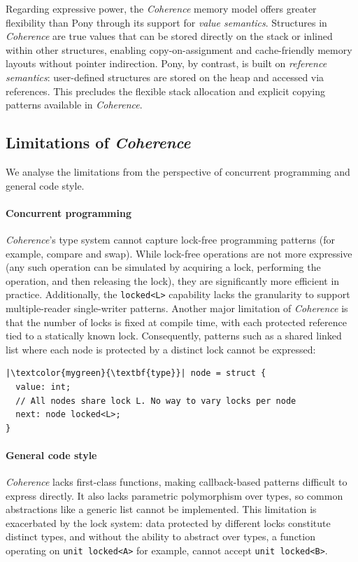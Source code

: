 Regarding expressive power, the \textit{Coherence} memory model offers greater flexibility than Pony through its support for \textit{value semantics}. Structures in \textit{Coherence} are true values that can be stored directly on the stack or inlined within other structures, enabling copy-on-assignment and cache-friendly memory layouts without pointer indirection. Pony, by contrast, is built on \textit{reference semantics}: user-defined structures are stored on the heap and accessed via references. This precludes the flexible stack allocation and explicit copying patterns available in \textit{Coherence}.

\subsection{Limitations of \textit{Coherence}} \label{sec:coherence-limitations}
We analyse the limitations from the perspective of concurrent programming and general code style.

\paragraph{Concurrent programming} \textit{Coherence}'s type system cannot capture lock-free programming patterns (for example, compare and swap). While lock-free operations are not more expressive (any such operation can be simulated by acquiring a lock, performing the operation, and then releasing the lock), they are significantly more efficient in practice. Additionally, the \texttt{locked<L>} capability lacks the granularity to support multiple-reader single-writer patterns. Another major limitation of \textit{Coherence} is that the number of locks is fixed at compile time, with each protected reference tied to a statically known lock. Consequently, patterns such as a shared linked list where each node is protected by a distinct lock cannot be expressed:
\begin{verbatim}
|\textcolor{mygreen}{\textbf{type}}| node = struct {
  value: int;
  // All nodes share lock L. No way to vary locks per node
  next: node locked<L>; 
}
\end{verbatim}

\paragraph{General code style} \textit{Coherence} lacks first-class functions, making callback-based patterns difficult to express directly. It also lacks parametric polymorphism over types, so common abstractions like a generic list cannot be implemented. This limitation is exacerbated by the lock system: data protected by different locks constitute distinct types, and without the ability to abstract over types, a function operating on \texttt{unit locked<A>} for example, cannot accept \texttt{unit locked<B>}.


